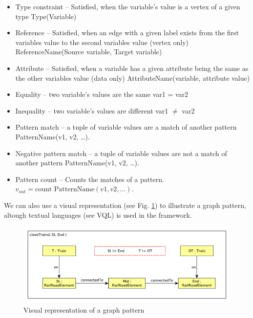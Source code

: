 \begin{itemize}
	\item Type constraint -- Satisfied, when the variable's value is a vertex of a given type
	\newline Type(Variable)
	
	\item Reference -- Satisfied, when an edge with a given label exists from the first variables value to the second variables value (vertex only)
	\newline ReferenceName(Source variable, Target variable)
	
	
	\item Attribute -- Satisfied, when a variable has a given attribute being the same as the other variables value (data only)
	\newline AttributeName(variable, attribute value)
		
	\item Equality -- two variable's values are the same
	\newline var1 = var2
		
	\item Inequality -- two variable's values are different
	\newline var1 $\neq$ var2
	
	\item Pattern match -- a tuple of variable values are a match of another pattern	
	\newline PatternName(v1, v2, \dots{}).
	
	\item Negative pattern match -- a tuple of variable values are not a match of another pattern	
	\newline PatternName(v1, v2, \dots{}).
	
	\item Pattern count -- Counts the matches of a pattern.
	\newline $v_{out} = \text{count PatternName}(v1, v2, \dots{})$.
\end{itemize}

We can also use a visual representation (see Fig. \ref{fig:pattern-visual}) to illustrate a graph pattern, altough textual languages (see VQL) is used in the framework.

\begin{figure}[h]
	\begin{center}
		\includegraphics[width=\textwidth]{figures/closeTrains-pattern.pdf}
		\caption{Visual representation of a graph pattern}
		\label{fig:pattern-visual}
	\end{center}
\end{figure}


